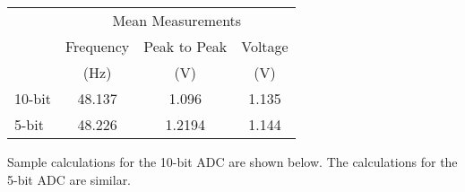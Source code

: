 \begin{table}[h]
    \centering
    \begin{tabular}{lccc}
           & \multicolumn{3}{c}{Mean Measurements}  \\
    \cmidrule{2-4}
           & Frequency & Peak to Peak & Voltage       \\
           & (Hz)      & (V)          & (V)           \\
    \midrule
    10-bit & 48.137  & 1.096        & 1.135         \\
    5-bit  & 48.226  & 1.2194       & 1.144         \\
    \bottomrule
    \end{tabular}
\end{table}

Sample calculations for the 10-bit ADC are shown below. The calculations for the 5-bit ADC are similar.